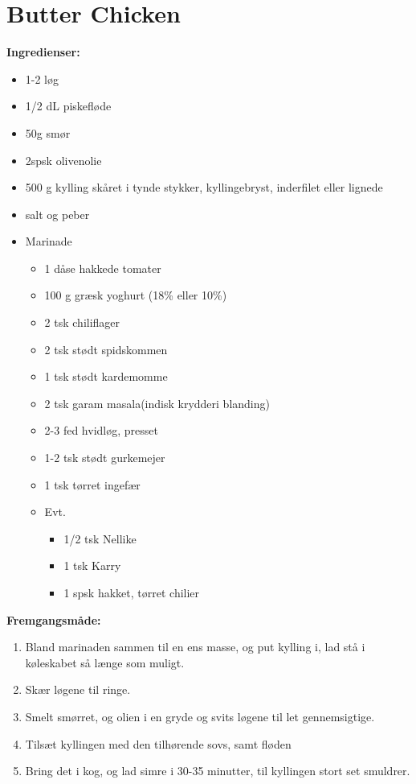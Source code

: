 \documentclass{book}
\begin{document}
\newpage \section{Butter Chicken}
\begin{minipage}[t]{0.5\textwidth}
\textbf{Ingredienser:}
\begin{itemize}
    \item 1-2 løg
    \item 1/2 dL piskefløde
    \item 50g smør
    \item 2spsk olivenolie
    \item 500 g kylling skåret i tynde stykker, kyllingebryst, inderfilet eller lignede
    \item salt og peber
    \item Marinade
    \begin{itemize}
        \item 1 dåse hakkede tomater
        \item 100 g græsk yoghurt (18\% eller 10\%)
        \item 2 tsk chiliflager
        \item 2 tsk stødt spidskommen
        \item 1 tsk stødt kardemomme
        \item 2 tsk garam masala(indisk krydderi blanding)
        \item 2-3 fed hvidløg, presset
        \item 1-2 tsk stødt gurkemejer
        \item 1 tsk tørret ingefær
        \item Evt.
        \begin{itemize}
            \item 1/2 tsk Nellike
            \item 1 tsk Karry
            \item 1 spsk hakket, tørret chilier
        \end{itemize}
    
    \end{itemize}
\end{itemize}
\end{minipage}
\begin{minipage}[t]{0.5\textwidth}
\textbf{Fremgangsmåde:}
\begin{enumerate}
    \item Bland marinaden sammen til en ens masse, og put kylling i, lad stå i køleskabet så længe som muligt.
    \item Skær løgene til ringe.
    \item Smelt smørret, og olien i en gryde og svits løgene til let gennemsigtige.
    \item Tilsæt kyllingen med den tilhørende sovs, samt fløden
    \item Bring det i kog, og lad simre i 30-35 minutter, til kyllingen stort set smuldrer.
\end{enumerate}
\end{minipage}
\end{document}
